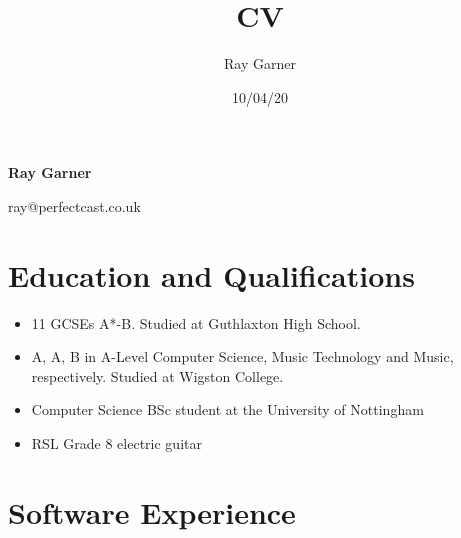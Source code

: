 \documentclass{article}
\title{CV}
\date{10/04/20}
\author{Ray Garner}
\makeatletter
\renewcommand{\maketitle}{
\vskip -5cm
\begin{center}


{\huge\bfseries
Ray Garner}

\vskip 0.25cm

{\large
ray@perfectcast.co.uk}

\vskip 1cm

\end{center}
}
\makeatother
\begin{document}
\maketitle



\section{Education and Qualifications}

\begin{itemize}[noitemsep]

\item 11 GCSEs A*-B. Studied at Guthlaxton High School.
\item A, A, B in A-Level Computer Science, Music Technology and Music, respectively. Studied at Wigston College.
\item Computer Science BSc student at the University of Nottingham
\item RSL Grade 8 electric guitar

\end{itemize}

\section{Software Experience}
\end{document}
